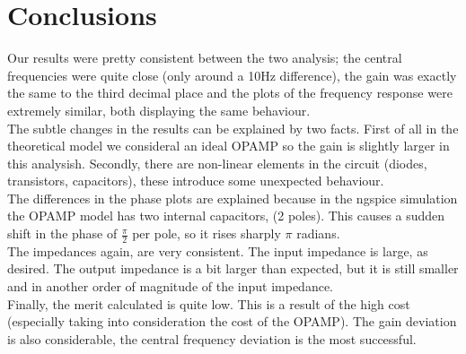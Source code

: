 \section{Conclusions}
\label{sec:conc}
Our results were pretty consistent between the two analysis; the central frequencies were quite close (only around a 10Hz difference), the gain was exactly the same to the third decimal place and the plots of the frequency response were extremely similar, both displaying the same behaviour. \\
The subtle changes in the results can be explained by two facts. First of all in the theoretical model we consideral an ideal OPAMP so the gain is slightly larger in this analysish. Secondly, there are non-linear elements in the circuit (diodes, transistors, capacitors), these introduce some unexpected behaviour.\\
The differences in the phase plots are explained because in the ngspice simulation the OPAMP model has two internal capacitors, (2 poles). This causes a sudden shift in the phase of $\frac{\pi}{2}$ per pole, so it rises sharply $\pi$ radians.\\
The impedances again, are very consistent. The input impedance is large, as desired. The output impedance is a bit larger than expected, but it is still smaller and in another order of magnitude of the input impedance.\\
Finally, the merit calculated is quite low. This is a result of the high cost (especially taking into consideration the cost of the OPAMP). The gain deviation is also considerable, the central frequency deviation is the most successful.
